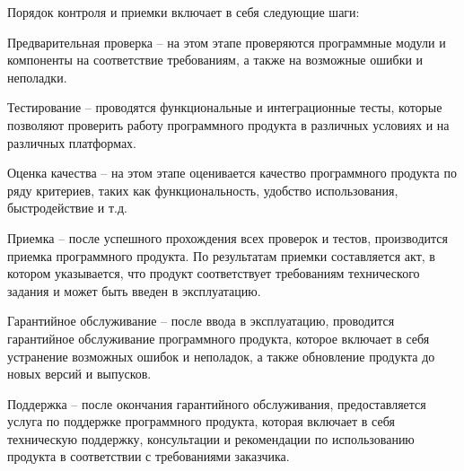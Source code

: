Порядок контроля и приемки включает в себя следующие шаги:

    Предварительная проверка – на этом этапе проверяются программные модули и компоненты на соответствие требованиям, а также на возможные ошибки и неполадки.

    Тестирование – проводятся функциональные и интеграционные тесты, которые позволяют проверить работу программного продукта в различных условиях и на различных платформах.

    Оценка качества – на этом этапе оценивается качество программного продукта по ряду критериев, таких как функциональность, удобство использования, быстродействие и т.д.

    Приемка – после успешного прохождения всех проверок и тестов, производится приемка программного продукта. По результатам приемки составляется акт, в котором указывается, что продукт соответствует требованиям технического задания и может быть введен в эксплуатацию.

    Гарантийное обслуживание – после ввода в эксплуатацию, проводится гарантийное обслуживание программного продукта, которое включает в себя устранение возможных ошибок и неполадок, а также обновление продукта до новых версий и выпусков.

    Поддержка – после окончания гарантийного обслуживания, предоставляется услуга по поддержке программного продукта, которая включает в себя техническую поддержку, консультации и рекомендации по использованию продукта в соответствии с требованиями заказчика.











